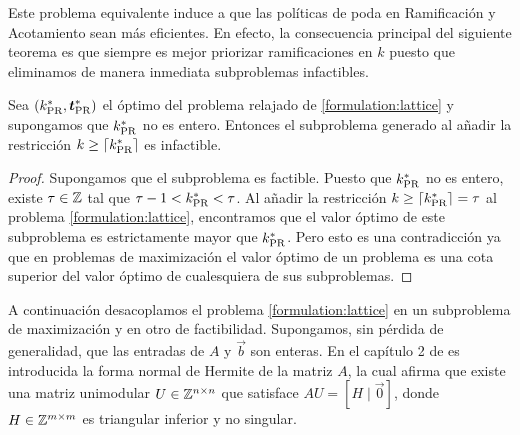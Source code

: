 
Este problema equivalente induce a que las políticas de poda en Ramificación y Acotamiento sean más
eficientes. En efecto, la consecuencia principal del siguiente teorema es que siempre es mejor
priorizar ramificaciones en $k$ puesto que eliminamos de manera inmediata subproblemas
infactibles.
\begin{theorem}
	\label{th:bbspeed}
	Sea $(k^*_{\text{PR}}, \boldsymbol{t}^*_{\text{PR}})$ el óptimo del problema relajado de \eqref{formulation:lattice}
	y supongamos que $k^*_{\text{PR}}$ no es entero. Entonces el subproblema generado al añadir la
	restricción $k \geq \left\lceil k^*_{\text{PR}} \right\rceil$ es infactible.
\end{theorem}
\begin{proof}
	Supongamos que el subproblema es factible. Puesto que $k^*_{\text{PR}}$ no es entero, existe $\tau \in
	\mathbb{Z}$ tal que $\tau - 1 < k^*_{\text{PR}} < \tau$. Al añadir la restricción $k \geq \left\lceil k^*_{\text{PR}} \right\rceil =
	\tau$ al problema \eqref{formulation:lattice}, encontramos que el valor óptimo de este
	subproblema es estrictamente mayor que $k^*_{\text{PR}}$. Pero esto es una contradicción ya que en
	problemas de maximización el valor óptimo de un problema es una cota superior del valor óptimo
	de cualesquiera de sus subproblemas.
\end{proof}
A continuación desacoplamos el problema \eqref{formulation:lattice} en un subproblema de
maximización y en otro de factibilidad. Supongamos, sin pérdida de generalidad, que las entradas de
$A$ y $\vec{b}$ son enteras. En el capítulo 2 de \cite{morris} es introducida la forma normal de
Hermite de la matriz $A$, la cual afirma que existe una matriz unimodular $U \in \mathbb{Z}^{n \times n}$
que satisface $AU = [H \mid \vec{0}]$, donde $H \in \mathbb{Z}^{m \times m}$ es triangular inferior y no
singular.

